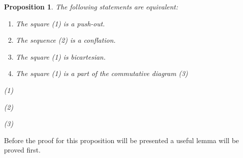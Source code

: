\documentclass[11pt]{article}
\newtheorem{prop}[theorem]{Proposition}
\theoremstyle{definition}
\theoremstyle{remark}
\begin{document}
            \begin{prop} 
                The following statements are equivalent:
                \begin{enumerate}
                    \item The square (1) is a push-out.
                    \item The sequence (2) is a conflation.
                    \item The square (1) is bicartesian.
                    \item The square (1) is a part of the commutative diagram (3)
                \end{enumerate}
                \begin{center}
                    (1)
                    \space (2)
                    \space (3)
                \end{center}
            \end{prop}

            Before the proof for this proposition will be presented a useful lemma will be proved first.
\end{document}
